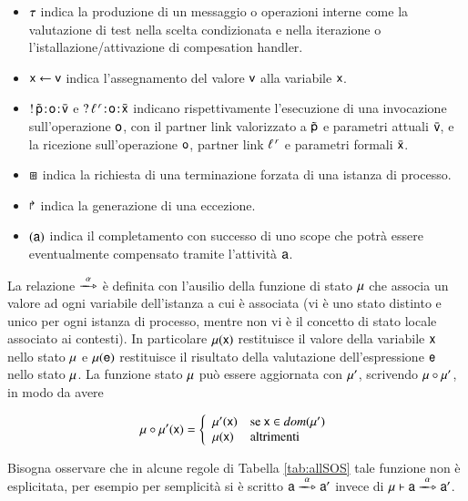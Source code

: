 \begin{itemize}
  \item $\tau$ indica la produzione di un messaggio o operazioni interne come
  la valutazione di test nella scelta condizionata e nella iterazione
  o l'istallazione/attivazione di compesation handler.
  \item ${\sf x} \leftarrow {\sf v}$ indica l'assegnamento del valore ${\sf v}$ alla
  variabile ${\sf x}$.
  \item $!\,\tilde{{\sf p}}\! : \! {\sf o}\! : \! \bar{{\sf v}}$ e
  $?\,\ell^{\,r}\! : \! {\sf o}\! : \! \bar{{\sf x}}$  indicano rispettivamente l'esecuzione di
  una invocazione sull'operazione ${\sf o}$, con il partner link valorizzato a
  $\tilde{{\sf p}}$ e parametri attuali $\bar{{\sf v}}$, e la ricezione sull'operazione
  ${\sf o}$, partner link $\ell^{\,r}$ e parametri formali $\bar{{\sf x}}$.
  \item $\boxast$ indica la richiesta di una terminazione forzata di una
  istanza di processo.
  \item $\Rsh$ indica la generazione di una eccezione.
  \item $({\sf a})$ indica il completamento con successo di uno scope
  che potrà essere eventualmente compensato tramite l'attività ${\sf a}$.
\end{itemize}

La relazione $\bpeltsarrow{\xalpha}$ è definita con l'ausilio della funzione di
stato ${\sf \mu}$ che associa un valore ad ogni variabile dell'istanza a cui è
associata (vi è uno stato distinto e unico per ogni istanza di processo, mentre
non vi è il concetto di stato locale associato ai contesti). In particolare
${\sf \mu}({\sf x})$ restituisce il valore della variabile ${\sf x}$ nello stato ${\sf \mu}$
e ${\sf \mu}({\sf e})$ restituisce il risultato della valutazione dell'espressione
${\sf e}$ nello stato ${\sf \mu}$. La funzione stato ${\sf \mu}$ può essere aggiornata
con ${\sf \mu}'$, scrivendo ${\sf \mu} \circ {\sf \mu}'$, in modo da avere 

$$
{\sf \mu} \circ {\sf \mu}'({\sf x}) = \left\{ 
\begin{array}{ll}
{\sf \mu}'({\sf x}) & \textrm{se ${\sf x} \in dom({\sf \mu}')$}\\
{\sf \mu}({\sf x}) & \textrm{altrimenti}\\
\end{array}
\right.
$$

Bisogna osservare che in alcune regole di Tabella \ref{tab:allSOS} tale
funzione non è esplicitata, per esempio per semplicità si è scritto
$\xinstnostate{\xsigma}{\xs}
\bpeltsarrow{\xalpha} \xinstnostate{\xsigma}{\xs'}$ invece di $\xinst{\xsigma}{\xs} \bpeltsarrow{\xalpha}
\xinstnostate{\xsigma}{\xs'}$.

